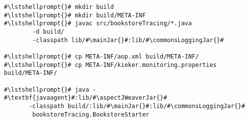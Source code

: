 \begin{lstlisting}[caption=Commands to compile and run the Bookstore under \UnixLikeSystems, label=lst:traceAnalysisCompileRunExample1]
#\lstshellprompt{}# mkdir build
#\lstshellprompt{}# mkdir build/META-INF
#\lstshellprompt{}# javac src/bookstoreTracing/*.java
        -d build/ 
        -classpath lib/#\mainJar{}#:lib/#\commonsLoggingJar{}#

#\lstshellprompt{}# cp META-INF/aop.xml build/META-INF/
#\lstshellprompt{}# cp META-INF/kieker.monitoring.properties build/META-INF/

#\lstshellprompt{}# java -#\textbf{javaagent}#:lib/#\aspectJWeaverJar{}# 
       -classpath build/:lib/#\mainJar{}#:lib/#\commonsLoggingJar{}#
        bookstoreTracing.BookstoreStarter
\end{lstlisting}
